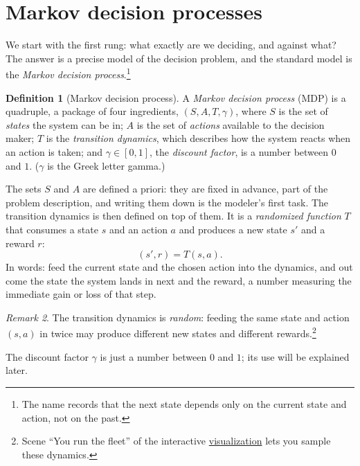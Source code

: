 \documentclass[11pt,a4paper]{article}
\theoremstyle{definition}
\newtheorem{definition}{Definition}[section]
\theoremstyle{remark}
\newtheorem{remark}[definition]{Remark}
\numberwithin{equation}{section}
\newcommand{\vizhref}[1]{\href{https://sml-fs26.github.io/classic_rl/repair-or-replace/}{#1}}
\begin{document}
\section{Markov decision processes}

We start with the first rung: what exactly are we deciding, and against what? The answer is a
precise model of the decision problem, and the standard model is the \emph{Markov decision
process}.\footnote{The name records that the next state depends only on the current state and
action, not on the past.}

\begin{definition}[Markov decision process]
A \emph{Markov decision process} (MDP) is a quadruple, a package of four ingredients,
$(S, A, T, \gamma)$, where $S$ is the set of \emph{states} the system can be in; $A$ is the
set of \emph{actions} available to the decision maker; $T$ is the \emph{transition dynamics},
which describes how the system reacts when an action is taken; and $\gamma \in [0,1]$, the
\emph{discount factor}, is a number between $0$ and $1$. ($\gamma$ is the Greek letter
gamma.)
\end{definition}

The sets $S$ and $A$ are defined a priori: they are fixed in advance, part of the problem
description, and writing them down is the modeler's first task. The transition dynamics is
then defined on top of them. It is a \emph{randomized function} $T$ that consumes a state $s$
and an action $a$ and produces a new state $s'$ and a reward $r$:
\[
(s', r) = T(s, a).
\]
In words: feed the current state and the chosen action into the dynamics, and out come the
state the system lands in next and the reward, a number measuring the immediate gain or loss
of that step.

\begin{remark}\label{rem:randomdyn}
The transition dynamics is \emph{random}: feeding the same state and action $(s, a)$ in twice
may produce different new states and different rewards.\footnote{Scene ``You run the fleet''
of the interactive \vizhref{visualization} lets you sample these dynamics.}
\end{remark}

The discount factor $\gamma$ is just a number between $0$ and $1$; its use will be explained
later.
\end{document}

